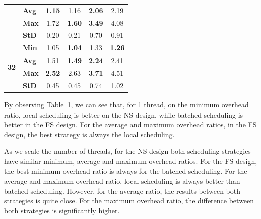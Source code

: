 \documentclass{llncs}
\begin{document}
\begin{table}[!ht]
\begin{tabular}{ll|cc|cc}
& {\bf Avg }& {\bf 1.15}& 1.16& {\bf 2.06}& 2.19\\
& {\bf Max }& 1.72& {\bf 1.60}& {\bf 3.49}& 4.08\\
& {\bf StD }& 0.20& 0.21& 0.70& 0.91\\
\hline
\multirow{4}{*}{\bf 32}
& {\bf Min }& 1.05& {\bf 1.04}& 1.33& {\bf 1.26}\\
& {\bf Avg }& 1.51& {\bf 1.49}& {\bf 2.24}& 2.41\\
& {\bf Max }& {\bf 2.52}& 2.63& {\bf 3.71}& 4.51\\
& {\bf StD }& 0.45& 0.45& 0.74& 1.02\\
\hline\hline
\end{tabular}%
\label{tab_batched_overhead}
\end{table}

By observing Table~\ref{tab_batched_overhead}, we can see that, for 1
thread, on the minimum overhead ratio, local scheduling is better on
the NS design, while batched scheduling is better in the FS
design. For the average and maximum overhead ratios, in the FS design,
the best strategy is always the local scheduling.   

As we scale the number of threads, for the NS design both scheduling
strategies have similar minimum, average and maximum overhead
ratios. For the FS design, the best minimum overhead ratio is always
for the batched scheduling. For the average and maximum overhead
ratio, local scheduling is always better than batched
scheduling. However, for the average ratio, the results between both
strategies is quite close. For the maximum overhead ratio, the
difference between both strategies is significantly higher. 

\end{document}
